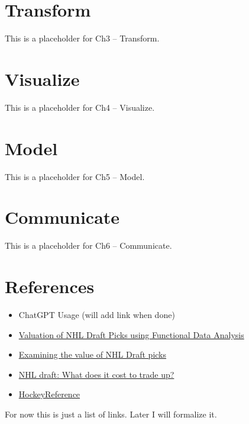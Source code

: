 \documentclass[
  letterpaper,
  DIV=11,
  numbers=noendperiod]{scrreprt}
\newlength{\cslhangindent}
\newenvironment{CSLReferences}[2] %
 {\begin{list}{}{%
  \setlength{\itemindent}{0pt}
  \setlength{\leftmargin}{0pt}
  \setlength{\parsep}{0pt}
  \ifodd #1
   \setlength{\leftmargin}{\cslhangindent}
   \setlength{\itemindent}{-1\cslhangindent}
  \fi
  \setlength{\itemsep}{#2\baselineskip}}}
 {\end{list}}
\begin{document}

\chapter{Transform}\label{transform}

This is a placeholder for Ch3 -- Transform.


\chapter{Visualize}\label{visualize}

This is a placeholder for Ch4 -- Visualize.


\chapter{Model}\label{model}

This is a placeholder for Ch5 -- Model.


\chapter{Communicate}\label{communicate}

This is a placeholder for Ch6 -- Communicate.


\chapter*{References}\label{references}


\label{refs}
\begin{CSLReferences}{0}{1}
\begin{itemize}
\item
  ChatGPT Usage (will add link when done)
\item
  \href{https://summit.sfu.ca/_flysystem/fedora/2023-02/etd22223.pdf}{Valuation
  of NHL Draft Picks using Functional Data Analysis}
\item
  \href{https://soundofhockey.com/2022/06/06/examining-the-value-of-nhl-draft-picks/amp/}{Examining
  the value of NHL Draft picks}
\item
  \href{https://www.broadstreethockey.com/post/nhl-draft-pick-value-trading-up/}{NHL
  draft: What does it cost to trade up?}
\item
  \href{https://www.hockey-reference.com/draft/}{HockeyReference}
\end{itemize}

\end{CSLReferences}

For now this is just a list of links. Later I will formalize it.
\end{document}
